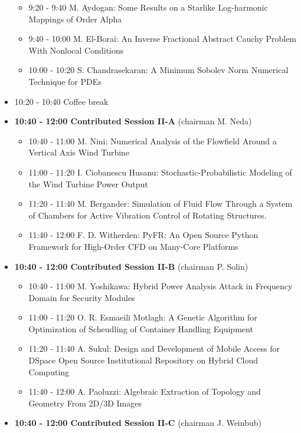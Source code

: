 \documentclass[10pt]{article}%
\begin{document}
\begin{itemize}
\begin{itemize}
    \item 9:20 - 9:40 {M. Aydogan}: {Some  Results on a Starlike  Log-harmonic Mappings of Order Alpha} %
    \item 9:40 - 10:00 {M. El-Borai}: {An Inverse Fractional Abstract Cauchy Problem With Nonlocal Conditions} 
    \item 10:00 - 10:20 {S. Chandrasekaran}: {A Minimum Sobolev Norm Numerical Technique for PDEs} %
  \end{itemize}
  \item 10:20 - 10:40 Coffee break
  \item {\bf 10:40 - 12:00 Contributed Session II-A} (chairman M. Neda) 
  \begin{itemize}
    \item 10:40 - 11:00 {M. Nini}: {Numerical Analysis of the Flowfield Around a Vertical Axis Wind Turbine}
    \item 11:00 - 11:20 {I. Ciobanescu Husanu}: {Stochastic-Probabilistic Modeling of the Wind Turbine Power Output}
    \item 11:20 - 11:40 {M. Bergander}: {Simulation of Fluid Flow Through a System of Chambers for Active Vibration Control of Rotating Structures.} %
    \item 11:40 - 12:00 {F. D. Witherden}: {PyFR: An Open Source Python Framework for High-Order CFD on Many-Core Platforms}
  \end{itemize}
  \item {\bf 10:40 - 12:00 Contributed Session II-B} (chairman P. Solin) 
  \begin{itemize}
    \item 10:40 - 11:00 {M. Yoshikawa}: {Hybrid Power Analysis Attack in Frequency Domain for Security Modules}
    \item 11:00 - 11:20 {O. R. Esmaeili Motlagh}: {A Genetic Algorithm for Optimization of Scheudling of Container Handling Equipment}
    \item 11:20 - 11:40 {A. Sukul}: {Design and Development of Mobile Access for DSpace Open Source Institutional Repository on Hybrid Cloud Computing} %
    \item 11:40 - 12:00 {A. Paoluzzi}: {Algebraic Extraction of Topology and Geometry From 2D/3D Images}
    \end{itemize}
    \newpage
  \item {\bf 10:40 - 12:00 Contributed Session II-C} (chairman J. Weinbub) 
  \begin{itemize}

\end{itemize}
\end{itemize}
\end{document}
